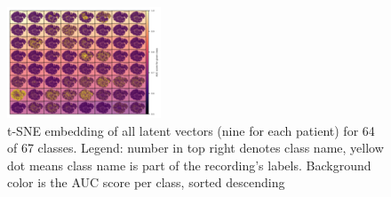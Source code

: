 \begin{figure}[H]\centering
	\includegraphics[height=\linewidth, angle=90]{bilder/tsne-latent-all(ordered by auc).png}
	\caption[Two dimensional t-SNE embeddings of all latent vectors]{t-SNE embedding of all latent vectors (nine for each patient) for 64 of 67 classes. Legend: number in top right denotes class name, yellow dot means class name is part of the recording's labels. Background color is the AUC score per class, sorted descending}
	\label{plot:tsne-latent-all}
\end{figure}

